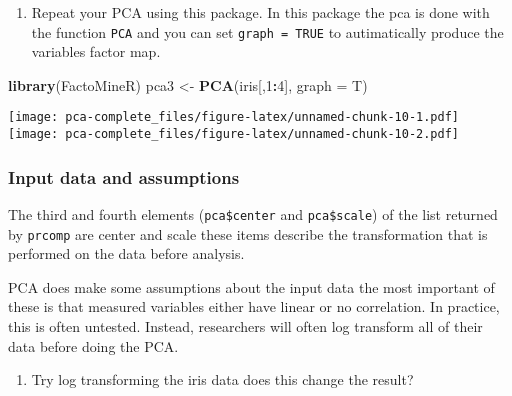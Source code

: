 \documentclass[]{article}
\newenvironment{Shaded}{\begin{snugshade}}{\end{snugshade}}
\newcommand{\DataTypeTok}[1]{\textcolor[rgb]{0.13,0.29,0.53}{#1}}
\newcommand{\DecValTok}[1]{\textcolor[rgb]{0.00,0.00,0.81}{#1}}
\newcommand{\KeywordTok}[1]{\textcolor[rgb]{0.13,0.29,0.53}{\textbf{#1}}}
\newcommand{\NormalTok}[1]{#1}
\newcommand{\OperatorTok}[1]{\textcolor[rgb]{0.81,0.36,0.00}{\textbf{#1}}}
\newcommand{\StringTok}[1]{\textcolor[rgb]{0.31,0.60,0.02}{#1}}
\providecommand{\tightlist}{%
  \setlength{\itemsep}{0pt}\setlength{\parskip}{0pt}}
\begin{document}
\begin{enumerate}
\def\labelenumi{\arabic{enumi})}
\setcounter{enumi}{6}
\tightlist
\item
  Repeat your PCA using this package. In this package the pca is done
  with the function \texttt{PCA} and you can set \texttt{graph\ =\ TRUE}
  to autimatically produce the variables factor map.
\end{enumerate}

\begin{Shaded}
\begin{Highlighting}[]
\KeywordTok{library}\NormalTok{(FactoMineR)}
\NormalTok{pca3 <-}\StringTok{ }\KeywordTok{PCA}\NormalTok{(iris[,}\DecValTok{1}\OperatorTok{:}\DecValTok{4}\NormalTok{], }\DataTypeTok{graph =}\NormalTok{ T)}
\end{Highlighting}
\end{Shaded}

\texttt{[image: pca-complete\_files/figure-latex/unnamed-chunk-10-1.pdf]}
\texttt{[image: pca-complete\_files/figure-latex/unnamed-chunk-10-2.pdf]}

\hypertarget{input-data-and-assumptions}{%
\subsubsection{Input data and
assumptions}\label{input-data-and-assumptions}}

The third and fourth elements (\texttt{pca\$center} and
\texttt{pca\$scale}) of the list returned by \texttt{prcomp} are center
and scale these items describe the transformation that is performed on
the data before analysis.

PCA does make some assumptions about the input data the most important
of these is that measured variables either have linear or no
correlation. In practice, this is often untested. Instead, researchers
will often log transform all of their data before doing the PCA.

\begin{enumerate}
\def\labelenumi{\arabic{enumi})}
\setcounter{enumi}{7}
\tightlist
\item
  Try log transforming the iris data does this change the result?
\end{enumerate}
\end{document}
